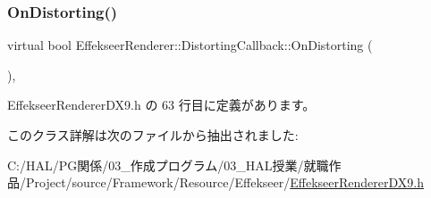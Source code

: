 \subsubsection{\texorpdfstring{On\+Distorting()}{OnDistorting()}}
{\footnotesize\ttfamily virtual bool Effekseer\+Renderer\+::\+Distorting\+Callback\+::\+On\+Distorting (\begin{DoxyParamCaption}{ }\end{DoxyParamCaption})\hspace{0.3cm}{\ttfamily [inline]}, {\ttfamily [virtual]}}



 Effekseer\+Renderer\+D\+X9.\+h の 63 行目に定義があります。



このクラス詳解は次のファイルから抽出されました\+:\begin{DoxyCompactItemize}
\item 
C\+:/\+H\+A\+L/\+P\+G関係/03\+\_\+作成プログラム/03\+\_\+\+H\+A\+L授業/就職作品/\+Project/source/\+Framework/\+Resource/\+Effekseer/\mbox{\hyperlink{_effekseer_renderer_d_x9_8h}{Effekseer\+Renderer\+D\+X9.\+h}}\end{DoxyCompactItemize}

